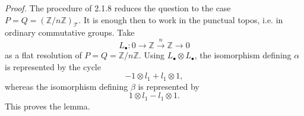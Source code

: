 \documentclass[11pt]{article}
\providecommand{\cT}{\mathcal T}
\begin{document}
\emph{Proof.}  The procedure of 2.1.8 reduces the question to the case \(P=Q=(\mathbb Z/n\mathbb Z)_\cT\).  It is enough then to work in the punctual topos, i.e. in ordinary commutative groups.  Take
\[
        L_\bullet:0\longrightarrow\mathbb Z\xrightarrow{n}\mathbb Z\longrightarrow0
\]
as a flat resolution of \(P=Q=\mathbb Z/n\mathbb Z\).  Using \(L_\bullet\otimes L_\bullet\), the isomorphism defining \(\alpha\) is represented by the cycle
\[
        -1\otimes l_1+l_1\otimes1,
\]
whereas the isomorphism defining \(\beta\) is represented by
\[
        1\otimes l_1-l_1\otimes1.
\]
This proves the lemma.
\end{document}
